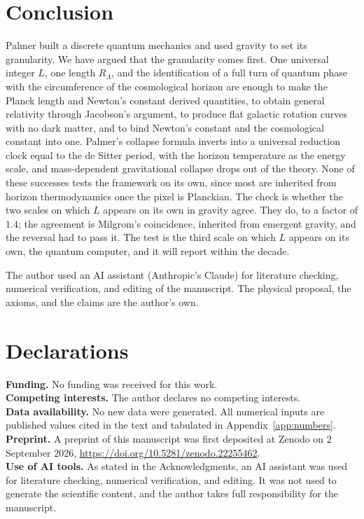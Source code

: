 \documentclass[aps,prd,twocolumn,superscriptaddress,nofootinbib,showkeys]{revtex4-2}
\begin{document}
\section{Conclusion}

Palmer built a discrete quantum mechanics and used gravity to set its granularity. We have argued that the granularity comes first. One universal integer $L$, one length $R_\Lambda$, and the identification of a full turn of quantum phase with the circumference of the cosmological horizon are enough to make the Planck length and Newton's constant derived quantities, to obtain general relativity through Jacobson's argument, to produce flat galactic rotation curves with no dark matter, and to bind Newton's constant and the cosmological constant into one. Palmer's collapse formula inverts into a universal reduction clock equal to the de Sitter period, with the horizon temperature as the energy scale, and mass-dependent gravitational collapse drops out of the theory. None of these successes tests the framework on its own, since most are inherited from horizon thermodynamics once the pixel is Planckian. The check is whether the two scales on which $L$ appears on its own in gravity agree. They do, to a factor of $1.4$; the agreement is Milgrom's coincidence, inherited from emergent gravity, and the reversal had to pass it. The test is the third scale on which $L$ appears on its own, the quantum computer, and it will report within the decade.

\begin{acknowledgments}
The author used an AI assistant (Anthropic's Claude) for literature checking, numerical verification, and editing of the manuscript. The physical proposal, the axioms, and the claims are the author's own.
\end{acknowledgments}

\section*{Declarations}
\noindent\textbf{Funding.} No funding was received for this work.\\
\textbf{Competing interests.} The author declares no competing interests.\\
\textbf{Data availability.} No new data were generated. All numerical inputs are published values cited in the text and tabulated in Appendix~\ref{app:numbers}.\\
\textbf{Preprint.} A preprint of this manuscript was first deposited at Zenodo on 2 September 2026, \url{https://doi.org/10.5281/zenodo.22255462}.\\
\textbf{Use of AI tools.} As stated in the Acknowledgments, an AI assistant was used for literature checking, numerical verification, and editing. It was not used to generate the scientific content, and the author takes full responsibility for the manuscript.
\end{document}
